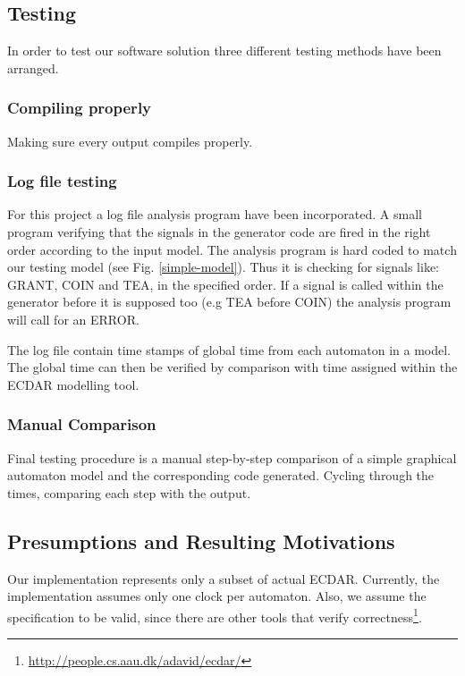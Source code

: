 \subsection{Testing}
\label{Testing}
In order to test our software solution three different testing methods have been
arranged.

\subsubsection{Compiling properly}
Making sure every output compiles properly.

\subsubsection{Log file testing}
For this project a log file analysis program have been incorporated. A small
program verifying that the signals in the generator code are fired in the right
order according to the input model.  The analysis program is hard coded to match
our testing model (see Fig. \ref{simple-model}). Thus it is checking for signals
like: GRANT, COIN and TEA, in the specified order. If a signal is called within
the generator before it is supposed too (e.g TEA before COIN) the analysis
program will call for an ERROR.

The log file contain time stamps of global time from each automaton in a model. The
global time can then be verified by comparison with time assigned within the
ECDAR modelling tool.

\subsubsection{Manual Comparison}
Final testing procedure is a manual step-by-step comparison of a simple
graphical automaton model and the corresponding code generated. Cycling through
the times, comparing each step with the output.

\subsection{Presumptions and Resulting Motivations}
\label{implementation-presumptions}

Our implementation represents only a subset of actual ECDAR. Currently, the
implementation assumes only one clock per automaton. Also, we assume the
specification to be valid, since there are other tools that verify
correctness\footnote{\url{http://people.cs.aau.dk/adavid/ecdar/}}.


